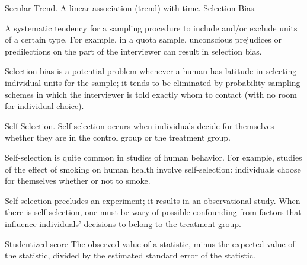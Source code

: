  
Secular Trend.
A linear association (trend) with time.
Selection Bias.
 
A systematic tendency for a sampling procedure to include and/or exclude units of a certain type. For example, in a quota sample, unconscious prejudices or predilections on the part of the interviewer can result in selection bias.
 
Selection bias is a potential problem whenever a human has latitude in selecting individual units for the sample; it tends to be eliminated by probability sampling schemes in which the interviewer is told exactly whom to contact (with no room for individual choice).
 
Self-Selection.
Self-selection occurs when individuals decide for themselves whether they are in the control group or the treatment group.
 
Self-selection is quite common in studies of human behavior. For example, studies of the effect of smoking on human health involve self-selection: individuals choose for themselves whether or not to smoke.
 
Self-selection precludes an experiment; it results in an observational study. When there is self-selection, one must be wary of possible confounding from factors that influence individuals' decisions to belong to the treatment group.
 
Studentized score
The observed value of a statistic, minus the expected value of the statistic, divided by the estimated standard error of the statistic.
